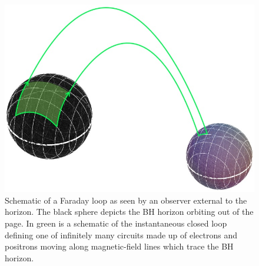 \begin{figure}
\begin{center}
\includegraphics[scale=0.33]{figures/ch7/BHB_ShadedFaradayContour} 
\end{center}
\caption{Schematic of a Faraday loop as seen by an observer external
  to the horizon. The black sphere depicts the BH horizon orbiting out
  of the page. In green is a schematic of the instantaneous closed
  loop defining one of infinitely many circuits made up of electrons
  and positrons moving along magnetic-field lines which trace the BH
  horizon.}
\label{Fig:Contour}
\end{figure}



